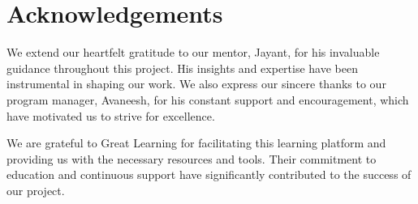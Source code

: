 \documentclass[11pt]{report}
\begin{document}
\vspace{2cm}

\chapter*{Acknowledgements}
We extend our heartfelt gratitude to our mentor, Jayant, for his invaluable guidance throughout this project. His insights and expertise have been instrumental in shaping our work. We also express our sincere thanks to our program manager, Avaneesh, for his constant support and encouragement, which have motivated us to strive for excellence.

We are grateful to Great Learning for facilitating this learning platform and providing us with the necessary resources and tools. Their commitment to education and continuous support have significantly contributed to the success of our project.

\tableofcontents
\listoffigures
\listoftables

\newpage
\setcounter{page}{0}




\renewcommand\bibname{References}
\printbibliography


\end{document}

